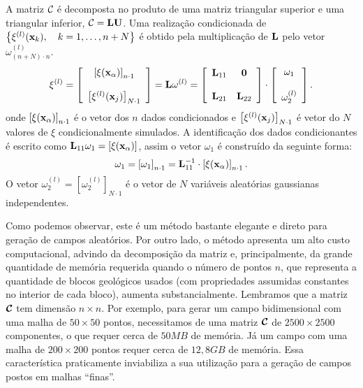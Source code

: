 \documentclass[12pt,a4paper,portuges]{article}
\newcommand{\cpy}{\xi}
\begin{document}
A matriz $\mathcal{C}_{}$ é decomposta no produto de uma matriz triangular superior e uma triangular
inferior, $\mathcal{C}_{}=\mathbf{LU}$. Uma realização condicionada de $\left\{\cpy^{(l)}(\vx_{k}),\quad
k=1,\dots,n+N\right\}$ é obtido pela multiplicação de $\mathbf{L}$ pelo vetor $\omega^{(l)}_{(n+N)\cdot
n}$.
\begin{equation}
   \cpy^{(l)}=\left[
   \begin{array}{c}
      \left[ \cpy(\vx_{\alpha})\right]_{n\cdot 1} \\ \\
      \left[ \cpy^{(l)}(\vx_{j})\right]_{N\cdot 1}  
   \end{array}
   \right] = \ten{L}\omega^{(l)} =
\left[
   \begin{array}{cc}
      \ten{L}_{11} & \ten{0} \\ \\
      \ten{L}_{21} & \ten{L}_{22}
   \end{array}
   \right] \cdot
\left[
   \begin{array}{c}
      \omega_{1}\\ \\
      \omega^{(l)}_{2}
   \end{array}
   \right].
\end{equation}
\noindent onde $\left[\cpy(\vx_{\alpha})\right]_{n\cdot 1}$ é o vetor dos $n$ dados condicionados e
$\left[ \cpy^{(l)}(\vx_{j})\right]_{N\cdot 1}$ é vetor do $N$ valores de $\cpy$ condicionalmente
simulados.
A identificação dos dados condicionantes é escrito como $\ten{L}_{11}\omega_{1} =
\left[\cpy(\vx_{\alpha})\right]$, assim o vetor $\omega_{1}$ é construído da seguinte forma:
\begin{equation}
   \omega_{1}=\left[ \omega_{1}\right]_{n\cdot 1} =
\ten{L}_{11}^{-1}\cdot\left[\cpy(\vx_{\alpha})\right]_{n\cdot 1}.
\end{equation}
O vetor $\omega_{2}^{(l)}=\left[\omega_{2}^{(l)} \right]_{N\cdot 1}$ é o vetor de $N$ variáveis
aleatórias gaussianas independentes.

Como podemos observar, este é  um método bastante elegante e direto para 
geração de campos aleatórios. Por outro lado, o método apresenta um 
alto custo computacional, advindo da decomposição da matriz e, 
principalmente, da grande quantidade de memória requerida quando o n\'umero de pontos $n$,  
que representa a quantidade de blocos geológicos 
usados (com propriedades assumidas constantes 
no interior de cada bloco),  aumenta substancialmente. 
Lembramos que a matriz $\boldsymbol{\mathcal{C}}$ tem dimensão $n\times n$. Por exemplo, para gerar um campo
bidimensional com uma malha de $50\times 50$ pontos, necessitamos de uma matriz
$\boldsymbol{\mathcal{C}}$ de $2500\times 2500$ componentes, o que requer cerca de $50MB$ de
memória. Já um campo com uma malha de $200\times 200$ pontos requer cerca de
$12,8GB$ de memória. Essa característica praticamente inviabiliza a sua
utilização para a geração de campos postos em malhas ``finas''.
\end{document}
